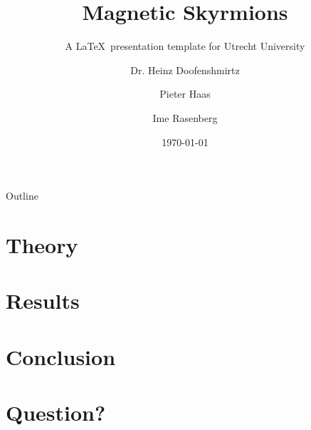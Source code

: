 \documentclass[aspectratio=169,10pt]{beamer}
\title[Magnetic Skyrmions]{%
  Magnetic Skyrmions%
}
\author[P.Haas, I.Rasenberg]{Dr. Heinz Doofenshmirtz}
\subtitle{A \LaTeX\ presentation template for Utrecht University}
\institute{Department of Information and Computing Sciences}
\date{\today}
\begin{document}


\subtitle{}
\author[Pieter \& Ime]{%
  Pieter Haas \and
  Ime Rasenberg%
}

\multiauthor
{}


\begin{frame}[plain]
  \titlepage
\end{frame}


\begin{frame}{Outline}
	\tableofcontents
\end{frame}



\section{Theory}



\section{Results}


\section{Conclusion}


\section{Question?}
\end{document}
